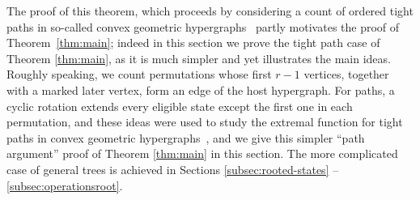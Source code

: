 \documentclass[11pt]{article}
\theoremstyle{remark}
\numberwithin{equation}{section}
\begin{document}
	The proof of this theorem, which proceeds by considering a count of ordered tight paths in so-called convex geometric hypergraphs~\cite{FJKMVpaths} partly motivates the proof of Theorem~\ref{thm:main}; indeed in this section we prove the tight path case of Theorem \ref{thm:main}, as it is much simpler and yet illustrates the main ideas. Roughly speaking, we count permutations whose first $r-1$ vertices, together with a marked later vertex, form an edge of the host hypergraph. For paths, a cyclic rotation extends every eligible state except the first one in each permutation, and these ideas were used to study the extremal function for tight paths in convex geometric hypergraphs~\cite{FJKMVpaths}, and we give this simpler ``path argument'' proof of Theorem \ref{thm:main} in this section. The more complicated case of general trees is achieved in Sections \ref{subsec:rooted-states} -- \ref{subsec:operationsroot}.
	
	
\end{document}
